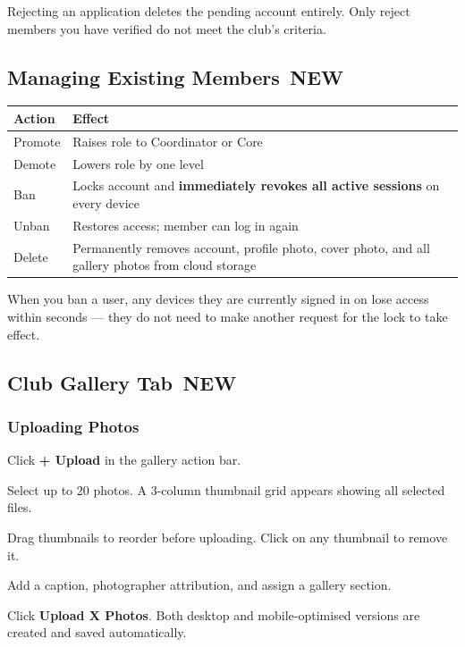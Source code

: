 \documentclass[12pt,a4paper]{article}
\newcommand{\newbadge}{%
  \colorbox{NewFrame}{\color{white}\,\textbf{\footnotesize NEW}\,}%
}
\begin{document}
\begin{warnbox}
Rejecting an application deletes the pending account entirely. Only reject members you have verified do not meet the club's criteria.
\end{warnbox}

\subsection{Managing Existing Members \newbadge}

\begin{center}
\renewcommand{\arraystretch}{1.35}
\begin{tabularx}{\linewidth}{L{2.8cm} X}
\toprule
\textbf{Action} & \textbf{Effect} \\
\midrule
Promote & Raises role to Coordinator or Core \\
Demote & Lowers role by one level \\
Ban & Locks account and \textbf{immediately revokes all active sessions} on every device \\
Unban & Restores access; member can log in again \\
Delete & Permanently removes account, profile photo, cover photo, and all gallery photos from cloud storage \\
\bottomrule
\end{tabularx}
\end{center}

\begin{notebox}
When you ban a user, any devices they are currently signed in on lose access within seconds --- they do not need to make another request for the lock to take effect.
\end{notebox}

\subsection{Club Gallery Tab \newbadge}

\subsubsection{Uploading Photos}
\begin{steps}
\item Click \textbf{+ Upload} in the gallery action bar.
\item Select up to 20 photos. A 3-column thumbnail grid appears showing all selected files.
\item Drag thumbnails to reorder before uploading. Click \texttimes{} on any thumbnail to remove it.
\item Add a caption, photographer attribution, and assign a gallery section.
\item Click \textbf{Upload X Photos}. Both desktop and mobile-optimised versions are created and saved automatically.
\end{steps}
\end{document}
